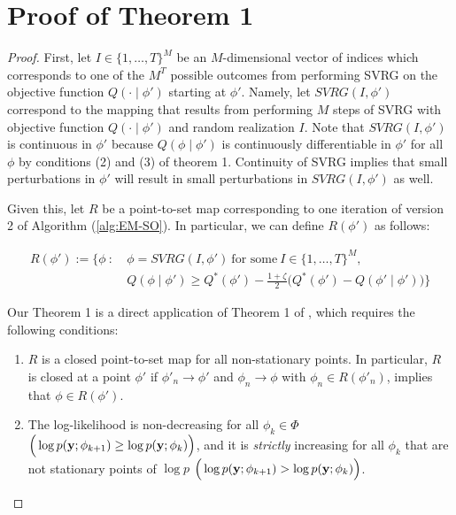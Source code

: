 \section{Proof of Theorem 1}

\begin{proof}

First, let $I \in \{1,\ldots,T\}^M$ be an $M$-dimensional vector of indices which corresponds to one of the $M^T$ possible outcomes from performing SVRG on the objective function $Q(\cdot \mid \phi')$ starting at $\phi'$. Namely, let $SVRG(I,\phi')$ correspond to the mapping that results from performing $M$ steps of SVRG with objective function $Q(\cdot \mid \phi')$ and random realization $I$. Note that $SVRG(I,\phi')$ is continuous in $\phi'$ because $Q(\phi \mid \phi')$ is continuously differentiable in $\phi'$ for all $\phi$ by conditions (2) and (3) of theorem 1. Continuity of SVRG implies that small perturbations in $\phi'$ will result in small perturbations in $SVRG(I,\phi')$ as well.

Given this, let $R$ be a point-to-set map corresponding to one iteration of version 2 of Algorithm (\ref{alg:EM-SO}). In particular, we can define $R(\phi')$ as follows:

\begin{align}
    R(\phi') := \Bigg\{\phi ~ : ~ & \phi = SVRG(I,\phi') ~ \text{for some} ~ I \in \{1,\ldots,T\}^M, \nonumber \\
    & Q(\phi \mid \phi') \geq Q^*(\phi') - \frac{1 + \zeta}{2} \Big( Q^*(\phi') - Q(\phi' \mid \phi') \Big)\Bigg\}
\end{align}

Our Theorem 1 is a direct application of Theorem 1 of \citet{Wu:1983}, which requires the following conditions:

\begin{enumerate}[label=(\alph*)]
    \item $R$ is a closed point-to-set map for all non-stationary points. In particular, $R$ is closed at a point $\phi'$ if $\phi'_{n} \to \phi'$ and $\phi_{n} \to \phi$ with $\phi_{n} \in R(\phi'_{n})$, implies that $\phi \in R(\phi')$. 
    \item The log-likelihood is non-decreasing for all $\phi_k \in \Phi$ $\Big(\log p(\mathbf{y};\phi_{k+1}) \geq \log p(\mathbf{y};\phi_k)\Big)$, and it is \textit{strictly} increasing for all $\phi_k$ that are not stationary points of $\log p$ $\Big(\log p(\mathbf{y};\phi_{k+1}) > \log p(\mathbf{y};\phi_k)\Big)$.
\end{enumerate}


\end{proof}
